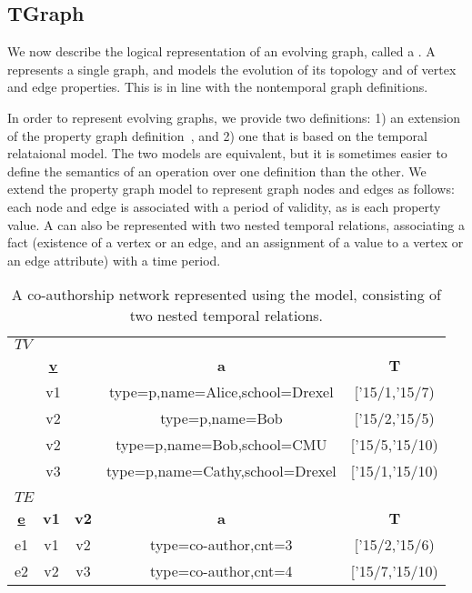 \subsection{TGraph}

We now describe the logical representation of an evolving graph,
called a \tg.  A \tg represents a single graph, and models the
evolution of its topology and of vertex and edge properties.  This is
in line with the nontemporal graph definitions.  

In order to represent evolving graphs, we provide two definitions: 1)
an extension of the property graph
definition~\cite{DBLP:journals/corr/AnglesABHRV16}, and 2) one that is
based on the temporal relataional model.  The two models are equivalent,
but it is sometimes easier to define the semantics of an operation
over one definition than the other.  We extend the property graph
model to represent graph nodes and edges as follows: each node and
edge is associated with a period of validity, as is each property
value.  A \tg can also be represented with two nested
temporal relations, associating a fact (existence of a vertex or an edge,
and an assignment of a value to a vertex or an edge attribute) with a
time period.

\begin{table*}
\caption{A co-authorship network represented using the \tg model,
  consisting of two nested temporal relations.}
\vspace{-0.2cm}
\label{tab:tg}
\centering
\begin{tabular}{| c | c | c | c | c |}
\hline
\multicolumn{5}{|l|}{$TV$} \\
\multicolumn{3}{|c}{\bfseries{\underline v}} & \multicolumn{1}{c}{\bfseries a} & \multicolumn{1}{c|}{\bfseries T}\\ \hline
\multicolumn{3}{|c|}{v1} & type=p,name=Alice,school=Drexel & ['15/1,'15/7) \\ \hline
\multicolumn{3}{|c|}{v2} & type=p,name=Bob & ['15/2,'15/5) \\ \hline
\multicolumn{3}{|c|}{v2} & type=p,name=Bob,school=CMU & ['15/5,'15/10) \\ \hline
\multicolumn{3}{|c|}{v3} & type=p,name=Cathy,school=Drexel & ['15/1,'15/10) \\ \hline
\multicolumn{5}{|l|}{} \\
\multicolumn{5}{|l|}{$TE$} \\
\multicolumn{1}{|c}{\bfseries{\underline e}} & \multicolumn{1}{c}{\bfseries v1} & \multicolumn{1}{c}{\bfseries v2} & \multicolumn{1}{c}{\bfseries a} & \multicolumn{1}{c|}{\bfseries T} \\ \hline
e1 & v1 & v2 & type=co-author,cnt=3 & ['15/2,'15/6) \\ \hline
e2 & v2 & v3 & type=co-author,cnt=4 & ['15/7,'15/10) \\ \hline
\end{tabular}
\vspace{-0.2cm}
\end{table*}

